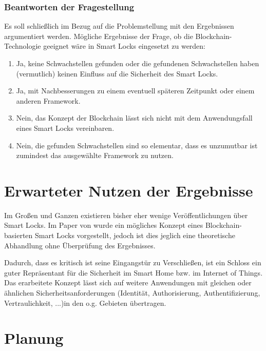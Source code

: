         \subsubsection*{Beantworten der Fragestellung}
            Es soll schließlich im Bezug auf die Problemstellung mit den Ergebnissen argumentiert werden.
            Mögliche Ergebnisse der Frage, ob die Blockchain-Technologie geeignet wäre in Smart Locks eingesetzt zu werden:
            \begin{enumerate}
                \item Ja, keine Schwachstellen gefunden oder die gefundenen Schwachstellen haben (vermutlich) keinen Einfluss auf die Sicherheit des Smart Locks.
                \item Ja, mit Nachbesserungen zu einem eventuell späteren Zeitpunkt oder einem anderen Framework.
                \item Nein, das Konzept der Blockchain lässt sich nicht mit dem Anwendungsfall eines Smart Locks vereinbaren.
                \item Nein, die gefunden Schwachstellen sind so elementar, dass es unzumutbar ist zumindest das ausgewählte Framework zu nutzen.
            \end{enumerate}


\section*{Erwarteter Nutzen der Ergebnisse}
    Im Großen und Ganzen existieren bisher eher wenige Veröffentlichungen über Smart Locks.
    Im Paper von \cite{Han2017} wurde ein mögliches Konzept eines Blockchain-basierten Smart Locks vorgestellt, jedoch ist dies jeglich eine theoretische Abhandlung ohne Überprüfung des Ergebnisses.
    
    Dadurch, dass es kritisch ist seine Eingangstür zu Verschließen, ist ein Schloss ein guter Repräsentant für die Sicherheit im Smart Home bzw. im Internet of Things. 
    Das erarbeitete Konzept lässt sich auf weitere Anwendungen mit gleichen oder ähnlichen Sicherheitsanforderungen (Identität, Authorisierung, Authentifizierung, Vertraulichkeit, ...)in den o.g. Gebieten übertragen.


\section*{Planung}
